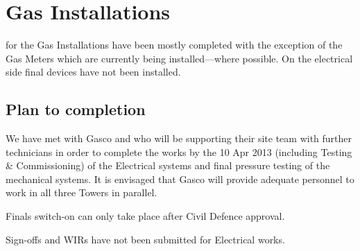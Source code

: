 \chapter{Gas Installations}


 for the Gas Installations have been mostly completed with the exception of the Gas Meters which are currently being installed---where possible. On the electrical side final devices have not been installed. 

\section{Plan to completion}

We have met with Gasco and who will be supporting their site team with further technicians in order to complete the works by the 10 Apr 2013 (including Testing \& Commissioning) of the Electrical systems and final pressure testing of the mechanical systems. It is envisaged that Gasco will provide adequate personnel to
work in all three Towers in parallel.

Finals switch-on can only take place after Civil Defence approval.

Sign-offs and WIRs have not been submitted for Electrical works.
\vspace*{1.5cm}

